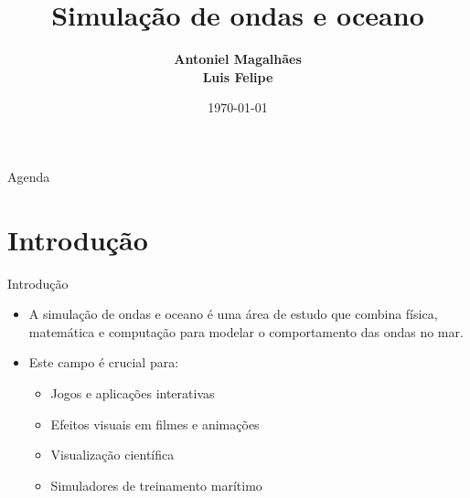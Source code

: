 \documentclass[aspectratio=169,xcolor=table]{beamer}
\author[Magalhães, Felipe]{%
  \textbf{Antoniel Magalhães} \\
  \textbf{Luis Felipe}
}
\title{Simulação de ondas e oceano}
\institute{Universidade Federal da Bahia \\ Instituto de Computação}
\date{\today}
\begin{document}
\begin{frame}
    \titlepage
\end{frame}

\begin{frame}{Agenda}
    \tableofcontents
\end{frame}

\setlength{\parskip}{1em} %

\section{Introdução}
\begin{frame}{Introdução}
    \begin{itemize}
        \item A simulação de ondas e oceano é uma área de estudo que combina física, matemática e computação para modelar o comportamento das ondas no mar.
        \item Este campo é crucial para:
        \begin{itemize}
            \item Jogos e aplicações interativas
            \item Efeitos visuais em filmes e animações
            \item Visualização científica
            \item Simuladores de treinamento marítimo
        \end{itemize}
    \end{itemize}
\end{frame}

\end{document}
